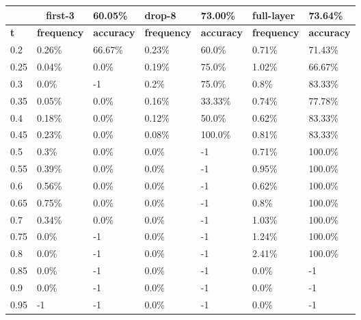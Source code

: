 
\begin{table}[t]
\centering
\begin{tabular}{lllllll}
\hline
\multicolumn{1}{c}{} & \multicolumn{1}{c}{first-3} & \multicolumn{1}{l|}{60.05\%} & drop-8 & \multicolumn{1}{l|}{73.00\%} & full-layer & 73.64\% \\ \hline
\multicolumn{1}{l|}{\textbf{t}} & \textbf{frequency} & \multicolumn{1}{l|}{\textbf{accuracy}} & \textbf{frequency} & \multicolumn{1}{l|}{\textbf{accuracy}} & \textbf{frequency} & \textbf{accuracy} \\ \hline	\multicolumn{1}{l|}{0.2}&  0.26\% & \multicolumn{1}{l|}{66.67\%}& 0.23\% & \multicolumn{1}{l|}{60.0\%}& 0.71\% & 71.43\%\\ 
\multicolumn{1}{l|}{0.25}&  0.04\% & \multicolumn{1}{l|}{0.0\%}& 0.19\% & \multicolumn{1}{l|}{75.0\%}& 1.02\% & 66.67\%\\ 
\multicolumn{1}{l|}{0.3}&  0.0\% & \multicolumn{1}{l|}{-1}& 0.2\% & \multicolumn{1}{l|}{75.0\%}& 0.8\% & 83.33\%\\ 
\multicolumn{1}{l|}{0.35}&  0.05\% & \multicolumn{1}{l|}{0.0\%}& 0.16\% & \multicolumn{1}{l|}{33.33\%}& 0.74\% & 77.78\%\\ 
\multicolumn{1}{l|}{0.4}&  0.18\% & \multicolumn{1}{l|}{0.0\%}& 0.12\% & \multicolumn{1}{l|}{50.0\%}& 0.62\% & 83.33\%\\ 
\multicolumn{1}{l|}{0.45}&  0.23\% & \multicolumn{1}{l|}{0.0\%}& 0.08\% & \multicolumn{1}{l|}{100.0\%}& 0.81\% & 83.33\%\\ 
\multicolumn{1}{l|}{0.5}&  0.3\% & \multicolumn{1}{l|}{0.0\%}& 0.0\% & \multicolumn{1}{l|}{-1}& 0.71\% & 100.0\%\\ 
\multicolumn{1}{l|}{0.55}&  0.39\% & \multicolumn{1}{l|}{0.0\%}& 0.0\% & \multicolumn{1}{l|}{-1}& 0.95\% & 100.0\%\\ 
\multicolumn{1}{l|}{0.6}&  0.56\% & \multicolumn{1}{l|}{0.0\%}& 0.0\% & \multicolumn{1}{l|}{-1}& 0.62\% & 100.0\%\\ 
\multicolumn{1}{l|}{0.65}&  0.75\% & \multicolumn{1}{l|}{0.0\%}& 0.0\% & \multicolumn{1}{l|}{-1}& 0.8\% & 100.0\%\\ 
\multicolumn{1}{l|}{0.7}&  0.34\% & \multicolumn{1}{l|}{0.0\%}& 0.0\% & \multicolumn{1}{l|}{-1}& 1.03\% & 100.0\%\\ 
\multicolumn{1}{l|}{0.75}&  0.0\% & \multicolumn{1}{l|}{-1}& 0.0\% & \multicolumn{1}{l|}{-1}& 1.24\% & 100.0\%\\ 
\multicolumn{1}{l|}{0.8}&  0.0\% & \multicolumn{1}{l|}{-1}& 0.0\% & \multicolumn{1}{l|}{-1}& 2.41\% & 100.0\%\\ 
\multicolumn{1}{l|}{0.85}&  0.0\% & \multicolumn{1}{l|}{-1}& 0.0\% & \multicolumn{1}{l|}{-1}& 0.0\% & -1\\ 
\multicolumn{1}{l|}{0.9}&  0.0\% & \multicolumn{1}{l|}{-1}& 0.0\% & \multicolumn{1}{l|}{-1}& 0.0\% & -1\\ 
\multicolumn{1}{l|}{0.95}&  -1 & \multicolumn{1}{l|}{-1}& 0.0\% & \multicolumn{1}{l|}{-1}& 0.0\% & -1\\ 


\end{tabular}
\end{table}
